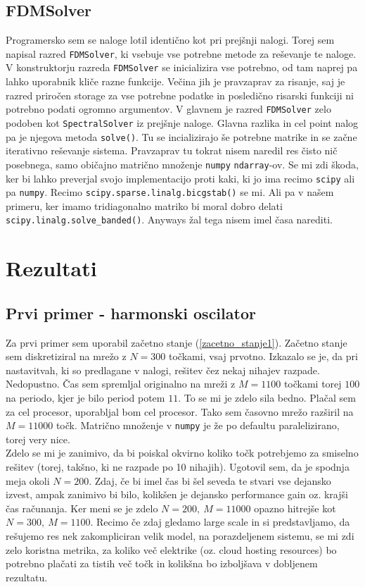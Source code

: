 \documentclass[a4paper]{article}
\begin{document}
\subsection{FDMSolver}
Programersko sem se naloge lotil identično kot pri prejšnji nalogi. Torej sem napisal razred \texttt{FDMSolver},
ki vsebuje vse potrebne metode za reševanje te naloge. V konstruktorju razreda \texttt{FDMSolver} se inicializira
vse potrebno, od tam naprej pa lahko uporabnik kliče razne funkcije. Večina jih je pravzaprav za risanje, saj je 
razred priročen storage za vse potrebne podatke in posledično risarski funkciji ni potrebno podati ogromno argumentov.
V glavnem je razred \texttt{FDMSolver} zelo podoben kot \texttt{SpectralSolver} iz prejšnje naloge. Glavna razlika
in cel point nalog pa je njegova metoda \texttt{solve()}. Tu se incializirajo še potrebne matrike in se začne iterativno
reševanje sistema. Pravzaprav tu tokrat nisem naredil res čisto nič posebnega, samo običajno matrično množenje
\texttt{numpy} \texttt{ndarray}-ov. Se mi zdi škoda, ker bi lahko preverjal svojo implementacijo proti kaki, ki jo 
ima recimo \texttt{scipy} ali pa \texttt{numpy}. Recimo \texttt{scipy.sparse.linalg.bicgstab()} se mi. Ali pa v našem
primeru, ker imamo tridiagonalno matriko bi moral dobro delati \texttt{scipy.linalg.solve\_banded()}. 
Anyways žal tega nisem imel časa narediti.\\

\section{Rezultati}
\subsection{Prvi primer - harmonski oscilator}
Za prvi primer sem uporabil začetno stanje (\ref{zacetno_stanje1}).
Začetno stanje sem diskretiziral na mrežo z $N=300$ točkami, vsaj prvotno. Izkazalo se je,
da pri nastavitvah, ki so predlagane v nalogi, rešitev čez nekaj nihajev razpade. Nedopustno.
Čas sem spremljal originalno na mreži z 
$M=1100$ točkami torej $100$ na periodo, kjer je bilo period potem $11$. To se mi je zdelo sila bedno. 
Plačal sem za cel procesor, uporabljal bom cel procesor. Tako sem časovno mrežo razširil na $M=11000$ točk.
Matrično množenje v \texttt{numpy} je že po defaultu paralelizirano, torej very nice. \\

Zdelo se mi je zanimivo, da bi poiskal okvirno koliko točk potrebjemo za smiselno rešitev (torej, takšno,
ki ne razpade po 10 nihajih). Ugotovil sem, da je spodnja meja okoli $N=200$. Zdaj, če bi imel čas 
bi šel seveda te stvari vse dejansko izvest, ampak zanimivo bi bilo, kolikšen je dejansko performance
gain oz. krajši čas računanja. Ker meni se je zdelo $N = 200,\> M = 11000$ opazno hitrejše kot 
$N = 300,\> M = 1100$. Recimo če zdaj gledamo large scale in si predstavljamo, da rešujemo res nek 
zakompliciran velik model, na porazdeljenem sistemu, se mi zdi zelo koristna metrika, za koliko 
več elektrike (oz. cloud hosting resources) bo potrebno plačati za tistih več točk in
kolikšna bo izboljšava v dobljenem rezultatu. \\
\end{document}
